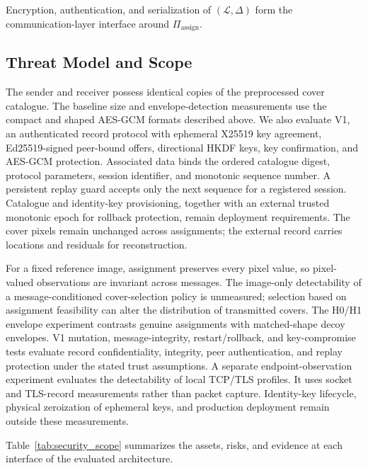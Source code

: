 \documentclass[preprint,12pt]{elsarticle}
\theoremstyle{plain}
\begin{document}
Encryption, authentication, and serialization of $(\mathcal{L},\Delta)$ form
the communication-layer interface around $\Pi_{\mathrm{assign}}$.

{\color{blue}
\subsection{Threat Model and Scope}

The sender and receiver possess identical copies of the preprocessed cover
catalogue. The baseline size and envelope-detection measurements use the
compact and shaped AES-GCM formats described above. We also evaluate V1, an
authenticated record protocol with ephemeral X25519 key agreement,
Ed25519-signed peer-bound offers, directional HKDF keys, key confirmation,
and AES-GCM protection. Associated data binds the ordered catalogue digest,
protocol parameters, session identifier, and monotonic sequence number. A
persistent replay guard accepts only the next sequence for a registered
session. Catalogue and identity-key provisioning, together with an external
trusted monotonic epoch for rollback protection, remain deployment
requirements. The cover pixels remain unchanged across assignments; the
external record carries locations and residuals for reconstruction.

For a fixed reference image, assignment preserves every pixel value, so
pixel-valued observations are invariant across messages. The image-only
detectability of a message-conditioned cover-selection policy is unmeasured;
selection based on assignment feasibility can alter the distribution of
transmitted covers. The H0/H1 envelope experiment contrasts genuine
assignments with matched-shape decoy envelopes. V1 mutation, message-integrity,
restart/rollback, and key-compromise tests evaluate record confidentiality,
integrity, peer authentication, and replay protection under the stated trust
assumptions. A separate endpoint-observation experiment evaluates the
detectability of local TCP/TLS profiles. It uses socket and TLS-record
measurements rather than packet capture. Identity-key lifecycle, physical
zeroization of ephemeral keys, and production deployment remain outside these
measurements.

Table~\ref{tab:security_scope} summarizes the assets, risks, and evidence at
each interface of the evaluated architecture.
\begin{table}[!t]
\centering
\footnotesize
\renewcommand{\arraystretch}{0.92}
\setlength{\tabcolsep}{3pt}
\caption{Security scope and evidence for the FHAM communication architecture.}
\label{tab:security_scope}

\end{table}


}
\end{document}
